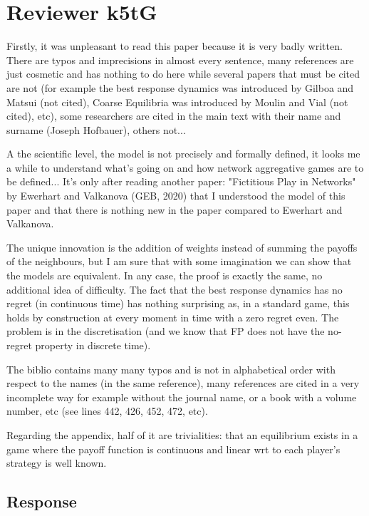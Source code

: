 \documentclass{article}
\begin{document}
	\section{Reviewer k5tG}
	
	Firstly, it was unpleasant to read this paper because it is very badly written. There are typos and imprecisions in almost every sentence, many references are just cosmetic and has nothing to do here while several papers that must be cited are not (for example the best response dynamics was introduced by Gilboa and Matsui (not cited), Coarse Equilibria was introduced by Moulin and Vial (not cited), etc), some researchers are cited in the main text with their name and surname (Joseph Hofbauer), others not...
	
	A the scientific level, the model is not precisely and formally defined, it looks me a while to understand what's going on and how network aggregative games are to be defined... It's only after reading another paper: "Fictitious Play in Networks" by Ewerhart and Valkanova (GEB, 2020) that I understood the model of this paper and that there is nothing new in the paper compared to Ewerhart and Valkanova.
	
	The unique innovation is the addition of weights instead of summing the payoffs of the neighbours, but I am sure that with some imagination we can show that the models are equivalent. In any case, the proof is exactly the same, no additional idea of difficulty. The fact that the best response dynamics has no regret (in continuous time) has nothing surprising as, in a standard game, this holds by construction at every moment in time with a zero regret even. The problem is in the discretisation (and we know that FP does not have the no-regret property in discrete time).
	
	The biblio contains many many typos and is not in alphabetical order with respect to the names (in the same reference), many references are cited in a very incomplete way for example without the journal name, or a book with a volume number, etc (see lines 442, 426, 452, 472, etc).
	
	Regarding the appendix, half of it are trivialities: that an equilibrium exists in a game where the payoff function is continuous and linear wrt to each player's strategy is well known.
	
	\subsection{Response}
	
\end{document}
